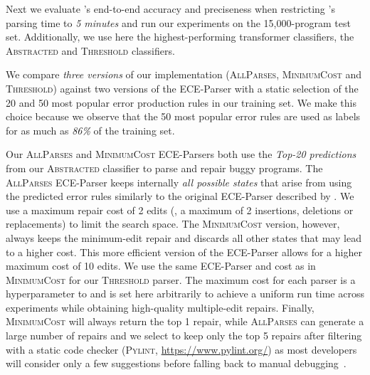 \fi 

Next we evaluate \toolname's end-to-end accuracy and preciseness when
restricting
\toolname's parsing time to \emph{5 minutes} and run our experiments on the
15,000-program test set. Additionally, we use here the highest-performing
transformer classifiers, \ie the \textsc{Abstracted} and \textsc{Threshold}
classifiers.

We compare \emph{three versions} of our \toolname implementation
(\textsc{AllParses}, \textsc{MinimumCost} and \textsc{Threshold}) against two
versions of the ECE-Parser with a static selection of the 20 and 50 most popular
error production rules in our training set. We make this choice because we
observe that the 50 most popular error rules are used as labels for as much as
\emph{86\%} of the training set.

Our \textsc{AllParses} and \textsc{MinimumCost} ECE-Parsers both use the
\emph{Top-20 predictions} from our \textsc{Abstracted} classifier to parse and
repair buggy programs. The \textsc{AllParses} ECE-Parser keeps internally
\emph{all possible states} that arise from using the predicted error rules
similarly to the original ECE-Parser described by \citet{Aho_1972}. We use a
maximum repair cost of 2 edits (\ie, a maximum of 2 insertions, deletions or
replacements) to limit the search space. The \textsc{MinimumCost} version,
however, always keeps the minimum-edit repair and discards all other states that
may lead to a higher cost. This more efficient version of the ECE-Parser allows
for a higher maximum cost of 10 edits. We use the same ECE-Parser and cost as in
\textsc{MinimumCost} for our \textsc{Threshold} parser. The maximum cost for
each parser is a hyperparameter to \toolname{} and is set here arbitrarily 
to achieve a uniform run time across experiments while obtaining
high-quality multiple-edit repairs. Finally, \textsc{MinimumCost} will always
return the top 1 repair, while \textsc{AllParses} can generate a large number of
repairs and we select to keep only the top 5 repairs after filtering with a
static code checker (\textsc{Pylint}, \url{https://www.pylint.org/}) as most
developers will consider only a few suggestions before falling back to manual
debugging~\citep{Kochhar2016-oc, Parnin2011-ce}.

